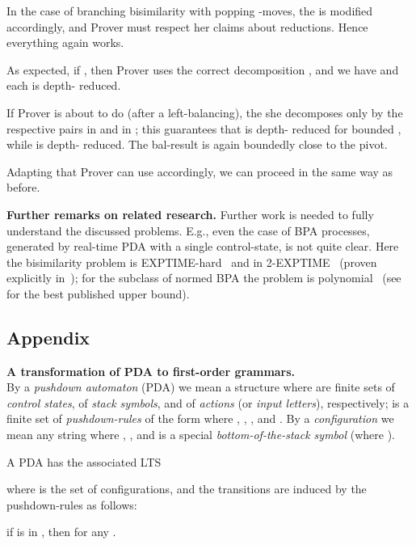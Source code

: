 \documentclass{llncs}
\begin{document}
In the case of branching bisimilarity with popping
-moves, the  is modified accordingly,
and Prover must respect her claims about reductions. Hence everything
again works.

As expected, if , then 
Prover uses the correct decomposition ,
and we have  and each  is depth- reduced. 


If Prover is about to do  
(after a left-balancing), the she decomposes only by the respective 
pairs in  and in ; this guarantees that 
 is depth- reduced for bounded , while  is
depth- reduced. The bal-result is again boundedly close to the
pivot. 

Adapting  that Prover can use accordingly, we can
proceed in the same way as before.

\fi

\smallskip

\noindent
\textbf{Further remarks on related research.}
Further work is needed to fully understand the discussed problems.
E.g., even the case 
of BPA processes, generated by real-time PDA with
a single control-state, is not quite clear.
Here the bisimilarity
problem is EXPTIME-hard~\cite{Kiefer13} and in 2-EXPTIME~\cite{DBLP:conf/mfcs/BurkartCS95} 
(proven explicitly in~\cite{Jan12b}); for the subclass of normed BPA
the problem is polynomial~\cite{HiJeMo96}
(see~\cite{CzLa10} for the best published upper bound).

















\subsection*{Appendix}

\textbf{A transformation of PDA  to first-order grammars.}
\\
By a \emph{pushdown automaton} (PDA) we mean a structure
 where  are finite sets of \emph{control
states}, of \emph{stack symbols}, and of \emph{actions} (or
\emph{input letters}), respectively;  is a finite set
of \emph{pushdown-rules} of the form  where , , , and
.
By a \emph{configuration} we mean any string  where ,
, and  is a special \emph{bottom-of-the-stack
symbol} (where ). 

A PDA  has the associated LTS
\begin{center}

\end{center}
where  is the set of configurations, and the transitions are
induced by the pushdown-rules as follows:
\begin{center}
if  is in , then 
 for any .
\end{center}
\end{document}
